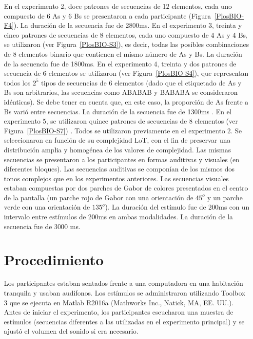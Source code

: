En el experimento 2, doce patrones de secuencias de 12 elementos, cada uno compuesto de 6 As y 6 Bs se presentaron a cada participante (Figura~\ref{PlosBIO-F4}). La duración de la secuencia fue de 2800ms. En el experimento 3, treinta y cinco patrones de secuencias de 8 elementos, cada uno compuesto de 4 As y 4 Bs, se utilizaron (ver Figura~\ref{PlosBIO-S3}), es decir, todas las posibles combinaciones de 8 elementos binario que contienen el mismo número de As y Bs. La duración de la secuencia fue de 1800ms. En el experimento 4, treinta y dos patrones de secuencia de 6 elementos se utilizaron (ver Figura~\ref{PlosBIO-S4}), que representan todos los $2^5$ tipos de secuencias de 6 elementos (dado que el etiquetado de As y Bs son arbitrarios, las secuencias como ABABAB y BABABA se consideraron idénticas). Se debe tener en cuenta que, en este caso, la proporción de As frente a Bs varió entre secuencias. La duración de la secuencia fue de 1300ms . En el experimento 5, se utilizaron quince patrones de secuencias de 8 elementos (ver Figura~\ref{PlosBIO-S7}) . Todos se utilizaron previamente en el experimento 2. Se seleccionaron en función de su complejidad LoT, con el fin de preservar una distribución amplia y homogénea de los valores de complejidad. Las mismas secuencias se presentaron a los participantes en formas auditivas y visuales (en diferentes bloques). Las secuencias auditivas se componían de los mismos dos tonos complejos que en los experimentos anteriores. Las secuencias visuales estaban compuestas por dos parches de Gabor de colores presentados en el centro de la pantalla (un parche rojo de Gabor con una orientación de $45^o$ y un parche verde con una orientación de $135^o$). La duración del estímulo fue de 200ms con un intervalo entre estímulos de 200ms en ambas modalidades. La duración de la secuencia fue de 3000 ms.

\section{Procedimiento}


Los participantes estaban sentados frente a una computadora en una habitación tranquila y usaban audífonos. Los estímulos se administraron utilizando  Toolbox 3 \cite{f134,f135} que se ejecuta en Matlab R2016a (Mathworks Inc., Natick, MA, EE. UU.). Antes de iniciar el experimento, los participantes escucharon una muestra de estímulos (secuencias diferentes a las utilizadas en el experimento principal) y se ajustó el volumen del sonido si era necesario.

